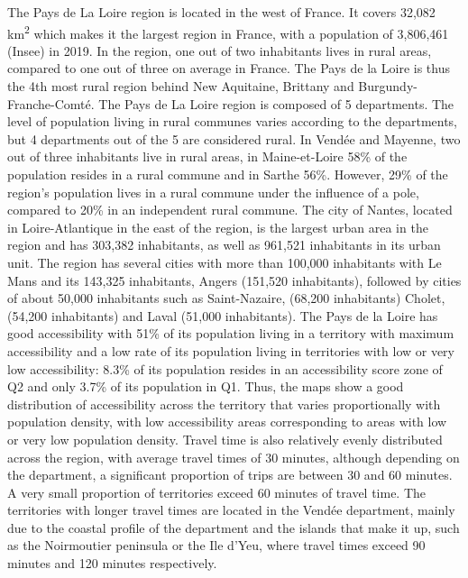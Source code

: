 The Pays de La Loire region is located in the west of France. It covers 32,082
km\textsuperscript{2} which makes it the largest region in France, with a
population of 3,806,461 (Insee) in 2019. In the region, one out of two
inhabitants lives in rural areas, compared to one out of three on average in
France. The Pays de la Loire is thus the 4th most rural region behind New
Aquitaine, Brittany and Burgundy-Franche-Comté.  The Pays de La Loire region is
composed of 5 departments. The level of population living in rural communes
varies according to the departments, but 4 departments out of the 5 are
considered rural.  In Vendée and Mayenne, two out of three inhabitants live in
rural areas, in Maine-et-Loire 58\% of the population resides in a rural commune
and in Sarthe 56\%. However, 29\% of the region's population lives in a rural
commune under the influence of a pole, compared to 20\% in an independent rural
commune. The city of Nantes, located in Loire-Atlantique in the east of the
region, is the largest urban area in the region and has 303,382 inhabitants, as
well as 961,521 inhabitants in its urban unit. The region has several cities
with more than 100,000 inhabitants with Le Mans and its 143,325 inhabitants,
Angers (151,520 inhabitants), followed by cities of about 50,000 inhabitants
such as Saint-Nazaire, (68,200 inhabitants) Cholet, (54,200 inhabitants) and
Laval (51,000 inhabitants). The Pays de la Loire has good accessibility with
51\% of its population living in a territory with maximum accessibility and a
low rate of its population living in territories with low or very low
accessibility: 8.3\% of its population resides in an accessibility score zone of
Q2 and only 3.7\% of its population in Q1. Thus, the maps show a good
distribution of accessibility across the territory that varies proportionally
with population density, with low accessibility areas corresponding to areas
with low or very low population density. Travel time is also relatively evenly
distributed across the region, with average travel times of 30 minutes, although
depending on the department, a significant proportion of trips are between 30
and 60 minutes. A very small proportion of territories exceed 60 minutes of
travel time. The territories with longer travel times are located in the Vendée
department, mainly due to the coastal profile of the department and the islands
that make it up, such as the Noirmoutier peninsula or the Ile d'Yeu, where
travel times exceed 90 minutes and 120 minutes respectively.

